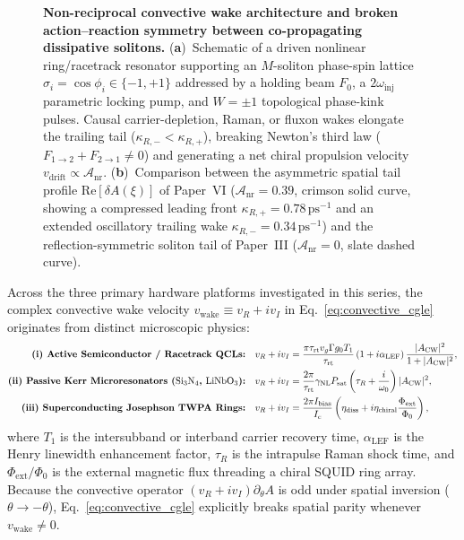 \documentclass[11pt,letterpaper]{article}
\begin{document}
\begin{figure}[t!]
\centering
\resizebox{0.98\textwidth}{!}{}
\caption{\textbf{Non-reciprocal convective wake architecture and broken action--reaction symmetry between co-propagating dissipative solitons.} (\textbf{a})~Schematic of a driven nonlinear ring/racetrack resonator supporting an $M$-soliton phase-spin lattice $\sigma_i = \cos\phi_i \in \{-1, +1\}$ addressed by a holding beam $F_0$, a $2\omega_{\mathrm{inj}}$ parametric locking pump, and $W = \pm 1$ topological phase-kink pulses. Causal carrier-depletion, Raman, or fluxon wakes elongate the trailing tail ($\kappa_{R,-} < \kappa_{R,+}$), breaking Newton's third law ($F_{1\to 2} + F_{2\to 1} \neq 0$) and generating a net chiral propulsion velocity $v_{\mathrm{drift}} \propto \mathcal{A}_{\mathrm{nr}}$. (\textbf{b})~Comparison between the asymmetric spatial tail profile $\mathrm{Re}[\delta A(\xi)]$ of Paper~VI ($\mathcal{A}_{\mathrm{nr}} = 0.39$, crimson solid curve, showing a compressed leading front $\kappa_{R,+} = 0.78\,\mathrm{ps}^{-1}$ and an extended oscillatory trailing wake $\kappa_{R,-} = 0.34\,\mathrm{ps}^{-1}$) and the reflection-symmetric soliton tail of Paper~III ($\mathcal{A}_{\mathrm{nr}} = 0$, slate dashed curve).}
\label{fig:architecture}
\end{figure}

Across the three primary hardware platforms investigated in this series, the complex convective wake velocity $v_{\mathrm{wake}} \equiv v_R + i v_I$ in Eq.~\eqref{eq:convective_cgle} originates from distinct microscopic physics:
\begin{subequations}
\label{eq:wake_microscopic}
\begin{align}
\text{\textbf{(i) Active Semiconductor / Racetrack QCLs:}}\quad v_R + i v_I &= \frac{\pi \tau_{\mathrm{rt}} v_g \Gamma g_0 T_1}{\tau_{\mathrm{rt}}}\left(1 + i\alpha_{\mathrm{LEF}}\right)\frac{|A_{\mathrm{CW}}|^2}{1 + |A_{\mathrm{CW}}|^2}, \label{eq:wake_qcl}\\
\text{\textbf{(ii) Passive Kerr Microresonators ($\mathrm{Si_3N_4}$, $\mathrm{LiNbO_3}$):}}\quad v_R + i v_I &= \frac{2\pi}{\tau_{\mathrm{rt}}}\gamma_{\mathrm{NL}} P_{\mathrm{sat}}\left(\tau_R + \frac{i}{\omega_0}\right)|A_{\mathrm{CW}}|^2, \label{eq:wake_kerr}\\
\text{\textbf{(iii) Superconducting Josephson TWPA Rings:}}\quad v_R + i v_I &= \frac{2\pi I_{\mathrm{bias}}}{I_c}\left(\eta_{\mathrm{diss}} + i\eta_{\mathrm{chiral}}\frac{\Phi_{\mathrm{ext}}}{\Phi_0}\right), \label{eq:wake_jj}
\end{align}
\end{subequations}
where $T_1$ is the intersubband or interband carrier recovery time, $\alpha_{\mathrm{LEF}}$ is the Henry linewidth enhancement factor, $\tau_R$ is the intrapulse Raman shock time, and $\Phi_{\mathrm{ext}}/\Phi_0$ is the external magnetic flux threading a chiral SQUID ring array. Because the convective operator $(v_R + i v_I)\partial_\theta A$ is odd under spatial inversion ($\theta \to -\theta$), Eq.~\eqref{eq:convective_cgle} explicitly breaks spatial parity whenever $v_{\mathrm{wake}} \neq 0$.
\end{document}
